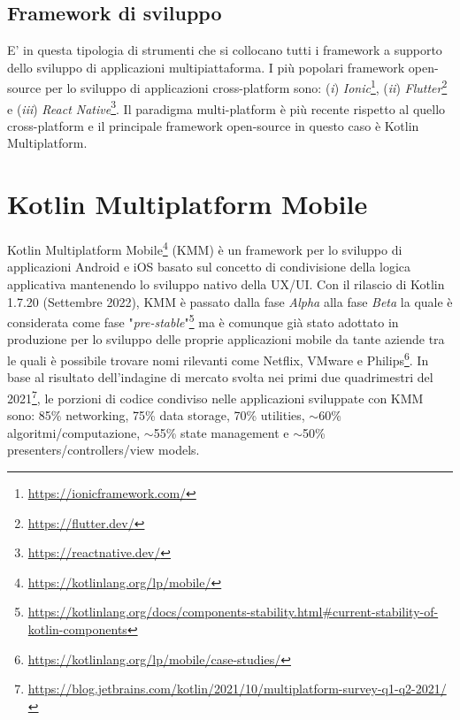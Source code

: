 \subsection*{Framework di sviluppo}
E' in questa tipologia di strumenti che si collocano tutti i framework a supporto dello sviluppo di applicazioni multipiattaforma. I più popolari framework open-source per lo sviluppo di applicazioni cross-platform sono: (\textit{i}) \textit{Ionic}\footnote{\href{https://ionicframework.com/}{https://ionicframework.com/}}, (\textit{ii}) \textit{Flutter}\footnote{\href{https://flutter.dev/}{https://flutter.dev/}} e (\textit{iii}) \textit{React Native}\footnote{\href{https://reactnative.dev/}{https://reactnative.dev/}}. Il paradigma multi-platform è più recente rispetto al quello cross-platform e il principale framework open-source in questo caso è Kotlin Multiplatform.

\section{Kotlin Multiplatform Mobile}
Kotlin Multiplatform Mobile\footnote{\href{https://kotlinlang.org/lp/mobile/}{https://kotlinlang.org/lp/mobile/}} (KMM) è un framework per lo sviluppo di applicazioni Android e iOS basato sul concetto di condivisione della logica applicativa mantenendo lo sviluppo nativo della UX/UI.
Con il rilascio di Kotlin 1.7.20 (Settembre 2022), KMM è passato dalla fase \textit{Alpha} alla fase \textit{Beta} la quale è considerata come fase "\textit{pre-stable}"\footnote{\href{https://kotlinlang.org/docs/components-stability.html\#current-stability-of-kotlin-components}{https://kotlinlang.org/docs/components-stability.html\#current-stability-of-kotlin-components}} ma è comunque già stato adottato in produzione per lo sviluppo delle proprie applicazioni mobile da tante aziende tra le quali è possibile trovare nomi rilevanti come Netflix, VMware e Philips\footnote{\href{https://kotlinlang.org/lp/mobile/case-studies/}{https://kotlinlang.org/lp/mobile/case-studies/}}. In base al risultato dell'indagine di mercato svolta nei primi due quadrimestri del 2021\footnote{\href{https://blog.jetbrains.com/kotlin/2021/10/multiplatform-survey-q1-q2-2021/}{https://blog.jetbrains.com/kotlin/2021/10/multiplatform-survey-q1-q2-2021/}}, le porzioni di codice condiviso nelle applicazioni sviluppate con KMM sono: 85\% networking, 75\% data storage, 70\% utilities, $\sim$60\% algoritmi/computazione, $\sim$55\% state management e $\sim$50\% presenters/controllers/view models.


